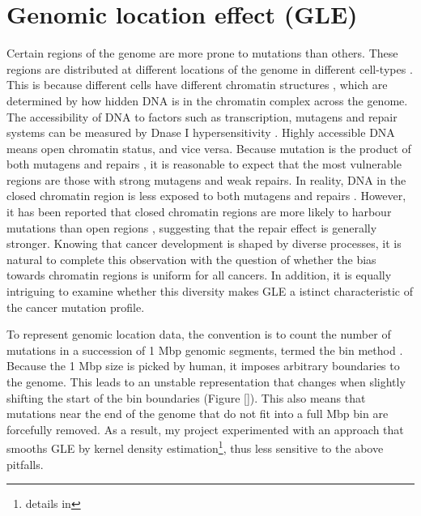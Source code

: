 \section{Genomic location effect (GLE)}
\label{intro:gle}
Certain regions of the genome are more prone to mutations than others. These regions are distributed at different locations of the genome in different cell-types \citep{Polak2015}. This is because different cells have different chromatin structures \citep{Abascal2020ExpandedGenomes}, which are determined by how hidden DNA is in the chromatin complex across the genome. The accessibility of DNA to factors such as transcription, mutagens and repair systems can be measured by Dnase I hypersensitivity \citep[DHS;][]{Liu2019AApplications}. Highly accessible DNA means open chromatin status, and vice versa. Because mutation is the product of both \glspl{mutagen} and repairs \citep{Ripley2001Mutation}, it is reasonable to expect that the most vulnerable regions are those with strong mutagens and weak repairs. In reality, DNA in the closed chromatin region is less exposed to both mutagens and repairs \citep[Figure \ref{fig:chromatin_demo};][]{Teng1997ExcisionSequences, Morse2002PhotoreactivationCerevisiae}. However, it has been reported that closed chromatin regions are more likely to harbour mutations than open regions \citep{Polak2015,Prendergast2007ChromatinGenome}, suggesting that the repair effect is generally stronger. Knowing that cancer development is shaped by diverse processes, it is natural to complete this observation with the question of whether the bias towards chromatin regions is uniform for all cancers. In addition, it is equally intriguing to examine whether this diversity makes GLE a istinct characteristic of the cancer mutation profile. 



To represent genomic location data, the convention is to count the number of mutations in a succession of 1 Mbp genomic segments, termed the bin method \citep{Kubler2019, Salvadores2019PassengerTumors, Chalmers2017AnalysisBurden, Salvadores2020MatchingPatterns}. Because the 1 Mbp size is picked by human, it imposes arbitrary boundaries to the genome. This leads to an unstable representation that changes when slightly shifting the start of the bin boundaries (Figure \ref{}). This also means that mutations near the end of the genome that do not fit into a full Mbp bin are forcefully removed. As a result, my project experimented with an approach that smooths GLE by kernel density estimation\footnote{details in}, thus less sensitive to the above pitfalls. 

